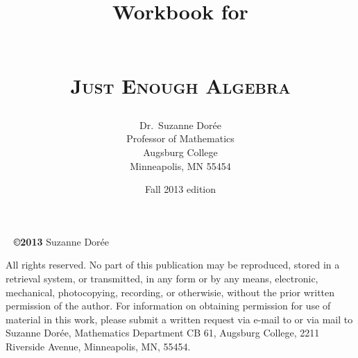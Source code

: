 \documentclass[11pt]{book}
\begin{document}

\title{\textbf{Workbook for}\\ ~ \\ \begin{Huge} \textsc{Just Enough Algebra}\end{Huge} }
\author{Dr.\ Suzanne Dor\'ee \\ Professor of Mathematics\\Augsburg College\\Minneapolis, MN 55454}
\date{Fall 2013 edition}
\maketitle


\newpage %

~\vfill 
\noindent \textbf{\copyright 2013} Suzanne Dor\'ee  

\noindent All rights reserved.  No part of this publication may be reproduced, stored in a retrieval system, or transmitted, in any form or by any means, electronic, mechanical, photocopying, recording, or otherwisie, without the prior written permission of the author.  For information on obtaining permission for use of material in this work, please submit a written request via e-mail to  or via mail to Suzanne Dor\'ee, Mathematics Department CB 61, Augsburg College, 2211 Riverside Avenue, Minneapolis, MN, 55454. 

\tableofcontents

            

      
       
       
       
       
       
      
      
    

      
       
       
       
      
       
      
      
    
\end{document}

